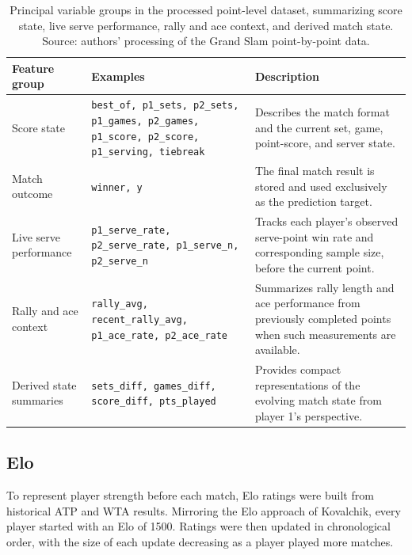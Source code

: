 \documentclass[10pt,twocolumn]{article}
\begin{document}
\begin{table}[H]
\centering
\caption{Principal variable groups in the processed point-level dataset, summarizing score state, live serve performance, rally and ace context, and derived match state. Source: authors' processing of the Grand Slam point-by-point data.\cite{sackmann_slam}}
\label{tab:constructed-features}
\scriptsize
\setlength{\tabcolsep}{2pt}
\begin{tabularx}{\columnwidth}{>{\raggedright\arraybackslash}p{} >{\raggedright\arraybackslash}p{} >{\raggedright\arraybackslash}X}
\toprule
\textbf{Feature group} & \textbf{Examples} & \textbf{Description} \\
\midrule
Score state & \texttt{best\_of, p1\_sets, p2\_sets, p1\_games, p2\_games, p1\_score, p2\_score, p1\_serving, tiebreak} & Describes the match format and the current set, game, point-score, and server state. \\
Match outcome & \texttt{winner, y} & The final match result is stored and used exclusively as the prediction target. \\
Live serve performance & \texttt{p1\_serve\_rate, p2\_serve\_rate, p1\_serve\_n, p2\_serve\_n} & Tracks each player's observed serve-point win rate and corresponding sample size, before the current point. \\
Rally and ace context & \texttt{rally\_avg, recent\_rally\_avg, p1\_ace\_rate, p2\_ace\_rate} & Summarizes rally length and ace performance from previously completed points when such measurements are available. \\
Derived state summaries & \texttt{sets\_diff, games\_diff, score\_diff, pts\_played} & Provides compact representations of the evolving match state from player 1's perspective. \\
\bottomrule
\end{tabularx}
\end{table}

\subsection{Elo}

To represent player strength before each match, Elo ratings were built from historical ATP and WTA results. Mirroring the Elo approach of Kovalchik,\cite{kovalchik2016} every player started with an Elo of 1500. Ratings were then updated in chronological order, with the size of each update decreasing as a player played more matches.
\end{document}
